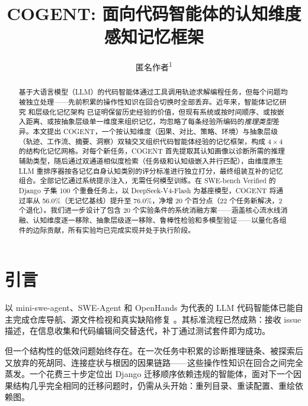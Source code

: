 \documentclass[UTF8,twocolumn]{ctexart}
\title{\textbf{COGENT: 面向代码智能体的认知维度感知记忆框架}}
\author{
    匿名作者\textsuperscript{\rm 1}
}
\date{}
\begin{document}
\maketitle

\begin{abstract}
基于大语言模型（LLM）的代码智能体通过工具调用轨迹求解编程任务，但每个问题均被独立处理——先前积累的操作性知识在回合切换时全部丢弃。近年来，智能体记忆研究 \cite{expel, reflexion, memgpt} 和层级化记忆架构 \cite{g-memory, evolve-mem} 已证明保留历史经验的价值，但现有系统或按时间顺序、或按嵌入距离、或按抽象层级单一维度来组织记忆，均忽略了每条经验所编码的\emph{推理类型}差异。本文提出 \textsc{COGENT}，一个按认知维度（因果、对比、策略、环境）与抽象层级（轨迹、工作流、摘要、洞察）双轴交叉组织代码智能体经验的记忆框架，构成 $4 \times 4$ 的结构化记忆网格。对每个新任务，\textsc{COGENT} 首先提取其认知画像以诊断所需的推理辅助类型，随后通过双通道相似度检索（任务级和认知级嵌入并行匹配），由维度原生 LLM 重排序器按各记忆自身认知类别的评分标准进行独立打分，最终组装互补的记忆组合。全部记忆通过系统提示注入，无需任何模型训练。在 SWE-bench Verified 的 Django 子集 100 个重叠任务上，以 DeepSeek-V4-Flash 为基座模型，\textsc{COGENT} 将通过率从 56.0\%（无记忆基线）提升至 76.0\%，净增 20 个百分点（22 个任务新解决，2 个退化）。我们进一步设计了包含 20 个实验条件的系统消融方案——涵盖核心流水线消融、认知维度逐一移除、抽象层级逐一移除、鲁棒性检验和多模型验证——以量化各组件的边际贡献，所有实验均已完成实现并处于执行阶段。
\end{abstract}

\begin{links}
\end{links}

\section{引言}

以 mini-swe-agent、SWE-Agent 和 OpenHands 为代表的 LLM 代码智能体已能自主完成仓库导航、源文件检视和真实缺陷修复 \cite{swe-agent, mini-swe-agent, openhands}。其标准流程已然成熟：接收 issue 描述，在信息收集和代码编辑间交替迭代，补丁通过测试套件即为成功。

但一个结构性的低效问题始终存在。在一次任务中积累的诊断推理链条、被探索后又放弃的死胡同、连接症状与根因的因果链路——这些操作性知识在回合之间完全蒸发。一个花费三十步定位出 Django 迁移顺序依赖违规的智能体，面对下一个因果结构几乎完全相同的迁移问题时，仍需从头开始：重列目录、重读配置、重绘依赖图。
\end{document}
